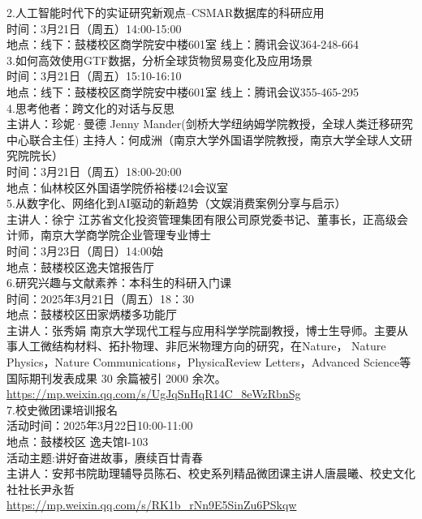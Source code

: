 \documentclass[letterpaper, 12pt]{article}
\begin{document}
\begin{multicols}{2}
2.人工智能时代下的实证研究新观点--CSMAR数据库的科研应用\\
时间：3月21日（周五）14:00-15:00\\
地点：线下：鼓楼校区商学院安中楼601室 线上：腾讯会议364-248-664\\

3.如何高效使用GTF数据，分析全球货物贸易变化及应用场景\\
时间：3月21日（周五）15:10-16:10\\
地点：线下：鼓楼校区商学院安中楼601室 线上：腾讯会议355-465-295\\

4.思考他者：跨文化的对话与反思\\
主讲人：珍妮·曼德 Jenny Mander(剑桥大学纽纳姆学院教授，全球人类迁移研究中心联合主任) 主持人：何成洲（南京大学外国语学院教授，南京大学全球人文研究院院长）\\
时间：3月21日（周五）18:00-20:00\\
地点：仙林校区外国语学院侨裕楼424会议室\\

5.从数字化、网络化到AI驱动的新趋势（文娱消费案例分享与启示）\\
主讲人：徐宁 江苏省文化投资管理集团有限公司原党委书记、董事长，正高级会计师，南京大学商学院企业管理专业博士\\
时间：3月23日（周日）14:00始\\
地点：鼓楼校区逸夫馆报告厅\\


6.研究兴趣与文献素养：本科生的科研入门课\\
时间：2025年3月21日（周五）18：30\\
地点：鼓楼校区田家炳楼多功能厅\\
主讲人：张秀娟 南京大学现代工程与应用科学学院副教授，博士生导师。主要从事人工微结构材料、拓扑物理、非厄米物理方向的研究，在Nature， Nature Physics，Nature Communications，PhysicaReview Letters，Advanced Science等国际期刊发表成果 30 余篇被引 2000 余次。\\
\url{https://mp.weixin.qq.com/s/UgJqSnHqR14C_8eWzRbnSg}\\

7.校史微团课培训报名\\
活动时间：2025年3月22日10:00-11:00\\
地点：鼓楼校区 逸夫馆Ⅰ-103\\
活动主题:讲好奋进故事，赓续百廿青春\\
主讲人：安邦书院助理辅导员陈石、校史系列精品微团课主讲人唐晨曦、校史文化社社长尹永哲\\
\url{https://mp.weixin.qq.com/s/RK1b_rNn9E5SinZu6PSkqw}\\


\end{multicols}
\end{document}
